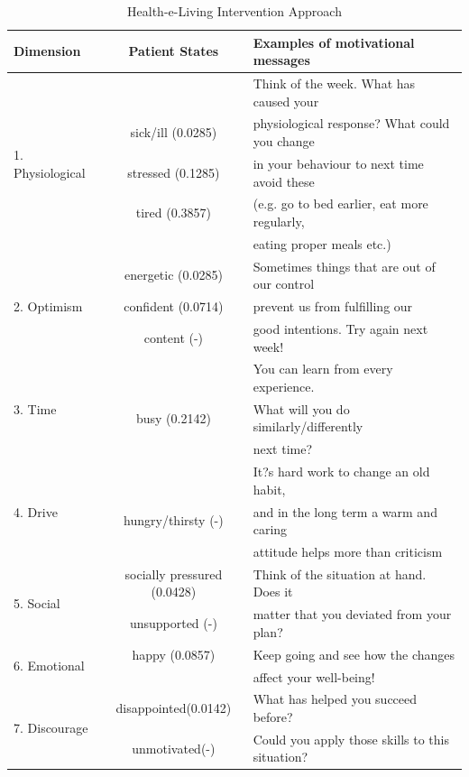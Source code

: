 \documentclass{llncs}
\begin{document}
\begin{table}[h]
\caption{ Health-e-Living Intervention Approach}
\begin{tabular}{ | l | c | l |}
\hline
Dimension & Patient States & Examples of motivational messages\\ \hline
\multirow{5}{*}{1. Physiological} &  & Think of the week. What has caused your  \\
 & sick/ill  (0.0285)  & physiological response? What could you change  \\
 & stressed (0.1285)  & in your behaviour to next time avoid these \\ 
&    tired (0.3857)  & (e.g. go to bed earlier, eat more regularly, \\ 
&   & eating proper meals etc.)  \\ \hline
\multirow{3}{*}{2. Optimism} & energetic (0.0285) & Sometimes things that are out of our control  \\
 &   confident  (0.0714)  & prevent us from fulfilling our\\
 &  content (-) &  good intentions. Try again next week!\\ \hline
\multirow{3}{*}{3. Time } &  & You can learn from every experience. \\ 
&  busy (0.2142)   &What will you do similarly/differently\\
&  &  next time? \\ \hline
\multirow{3}{*}{4. Drive} &  & It?s hard work to change an old habit, \\
& hungry/thirsty (-) & and in the long term a warm and caring \\
& &  attitude helps more than criticism\\ \hline
\multirow{2}{*}{5. Social } &  socially pressured (0.0428) & Think of the situation at hand. Does it  \\
 &  unsupported (-) & matter that you deviated from your plan? \\ \hline
\multirow{2}{*}{6. Emotional } & happy (0.0857)  & Keep going and see how the changes \\ 
& & affect your well-being!\\ \hline
\multirow{2}{*}{7. Discourage } &  disappointed(0.0142) & What has helped you succeed before? \\
 &  unmotivated(-)  & Could you apply those skills to this situation?\\ \hline
\hline
\end{tabular}
\label{Tab.States}
\end{table}
\end{document}
